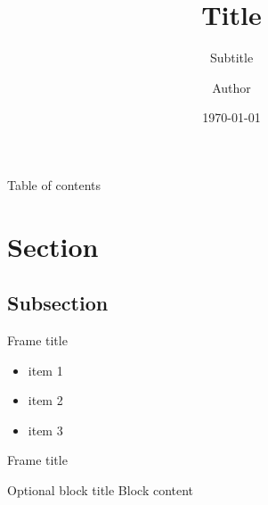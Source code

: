 \documentclass{build/WISbeamer}
\author{Author}
\institute{Department}
\title{Title}
\date[\today]{\today}
\subtitle{Subtitle}
\begin{document}
\begin{frame}[plain,b]
  \titlepage
\end{frame}

\begin{frame}[t]{Table of contents}	

	\tableofcontents

\end{frame}

\section{Section}
\subsection{Subsection}

\begin{frame}[t]{Frame title}	

		\begin{itemize}
			\item item 1
			\item item 2
			\item item 3
		\end{itemize}

\end{frame}

\begin{frame}[t]{Frame title}	

		\begin{block}{Optional block title}
			Block content
		\end{block}

\end{frame}
\end{document}
